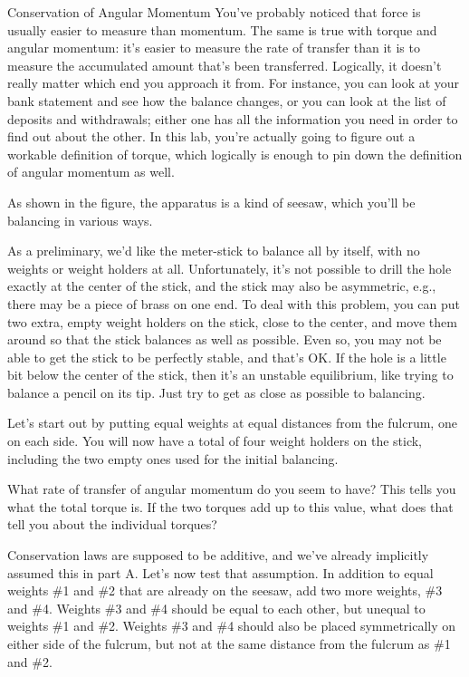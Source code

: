 \begin{lab}{Conservation of Angular Momen\-tum}
You've probably noticed that force is usually easier to measure than momentum. The
same is true with torque and angular momentum: it's easier to measure the rate of
transfer than it is to measure the accumulated amount that's been transferred. Logically,
it doesn't really matter which end you approach it from. For instance, you can look at
your bank statement and see how the balance changes, or you can look at the list of
deposits and withdrawals; either one has all the information you need in order to find
out about the other. In this lab, you're actually going to figure out a workable definition
of torque, which logically is enough to pin down the definition of angular momentum as well.


As shown in the figure, the apparatus is a kind of seesaw, which you'll be balancing in
various ways.


As a preliminary, we'd like the meter-stick to balance all by itself, with no weights or
weight holders at  all. Unfortunately, it's not possible to drill the hole exactly at the
center of the stick, and the stick may also be asymmetric, e.g., there may be a piece
of brass on one end. To deal with this problem, you can put two extra, empty weight holders on
the stick, close to the center, and move them around so that the stick balances as well as
possible.
Even so, you may not be able to get the stick to be perfectly stable, and that's OK.
If the hole is
a little bit below the center of the stick, then it's an unstable equilibrium, like trying
to balance a pencil on its tip. 
Just try to get as close as possible to balancing.

Let's start out by putting equal
weights at equal distances from the fulcrum, one on each side. You will now have a total
of four weight holders on the stick, including the two empty ones used for the initial
balancing.

What rate of transfer of
angular momentum do you seem to have? This tells you what the total torque is. If the
two torques add up to this value, what does that tell you about the individual torques?

Conservation laws are supposed to be additive, and we've already implicitly assumed this
in part A. Let's now test that assumption. In addition to equal weights \#1 and \#2 that are
already on the seesaw, add two more weights, \#3 and \#4. Weights \#3 and \#4 should be
equal to each other, but unequal to weights \#1 and \#2. Weights \#3 and \#4 should also be
placed symmetrically on either side of the fulcrum, but not at the same distance from the
fulcrum as \#1 and \#2.


\end{lab}
